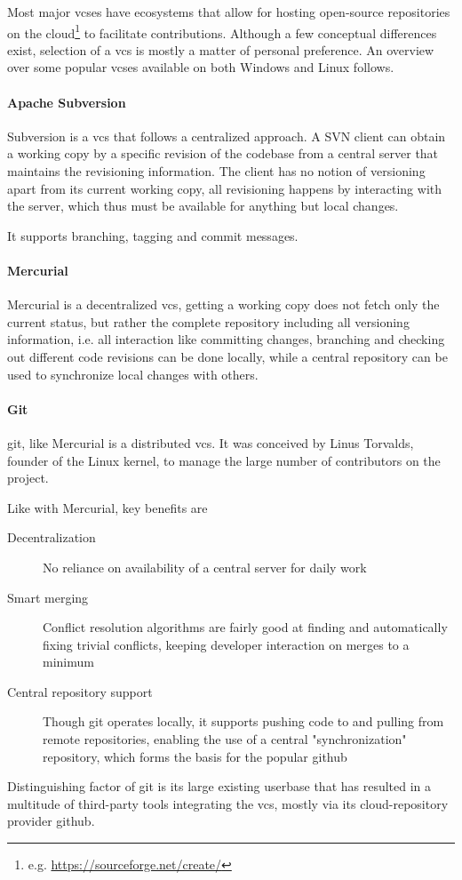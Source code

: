 Most major \gls{vcs}es have ecosystems that allow for hosting open-source repositories on the \gls{cloud}\footnote{e.g. \url{https://sourceforge.net/create/}} to facilitate contributions. Although a few conceptual differences exist, selection of a \gls{vcs} is mostly a matter of personal preference. 
An overview over some popular \gls{vcs}es available on both Windows and Linux follows.

\paragraph{Apache Subversion}
Subversion is a \gls{vcs} that follows a centralized approach. A SVN client can obtain a working copy by  a specific revision of the codebase from a central server that maintains the revisioning information. The client has no notion of versioning apart from its current working copy, all revisioning happens by interacting with the server, which thus must be available for anything but local changes.

It supports branching, tagging and commit messages.

\paragraph{Mercurial}
Mercurial is a decentralized \gls{vcs}, getting a working copy does not fetch only the current status, but rather the complete repository including all versioning information, i.e. all interaction like committing changes, branching and checking out different code revisions can be done locally, while a central repository can be used to synchronize local changes with others.

\paragraph{Git}
\gls{git}, like Mercurial is a distributed \gls{vcs}. It was conceived by Linus Torvalds, founder of the Linux kernel, to manage the large number of contributors on the project.

Like with Mercurial, key benefits are
\begin{description}
	\item[Decentralization] No reliance on availability of a central server for daily work
	\item[Smart merging] Conflict resolution algorithms are fairly good at finding and automatically fixing trivial conflicts, keeping developer interaction on merges to a minimum
	\item[Central repository support] Though git operates locally, it supports pushing code to and pulling from remote repositories, enabling the use of a central "synchronization" repository, which forms the basis for the popular \gls{github} 
\end{description}
Distinguishing factor of \gls{git} is its large existing userbase that has resulted in a multitude of third-party tools integrating the \gls{vcs}, mostly via its \gls{cloud}-repository provider \gls{github}.

